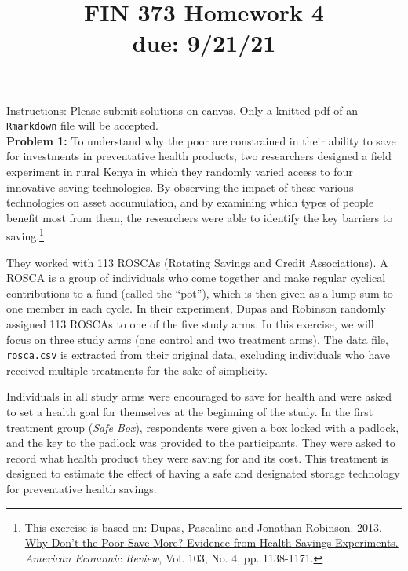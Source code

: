 \documentclass[11pt]{article}
\begin{document}
\title{FIN 373 Homework 4 \\ {\large due: \textbf{9/21/21}}}
\date{}
\maketitle

\vspace{-20mm}

\noindent Instructions: Please submit solutions on canvas.  Only a knitted pdf of an {\tt Rmarkdown} file will be accepted.
\\

\noindent \textbf{Problem 1:} To understand why the poor are constrained in their ability to save for investments in preventative health products, two researchers designed a field experiment in rural Kenya in which they randomly varied access to four innovative saving technologies. By observing the impact of these various technologies on asset accumulation, and by examining which types of people benefit most from them, the researchers were able to identify the key barriers to saving.\footnote{This exercise is based on: \href{http://dx.doi.org/10.1257/aer.103.4.1138}{Dupas, Pascaline and Jonathan Robinson. 2013. Why Don't the Poor Save More? Evidence from Health Savings Experiments.} \textit{American Economic Review}, Vol. 103, No. 4, pp. 1138-1171.}

They worked with 113 ROSCAs (Rotating Savings and Credit Associations). A ROSCA is a group of individuals who come together and make regular cyclical contributions to a fund (called the ``pot''), which is then given as a lump sum to one member in each cycle. In their experiment, Dupas and Robinson randomly assigned 113 ROSCAs to one of the five study arms. In this exercise, we will focus on three study arms (one control and two treatment arms). The data file, {\tt rosca.csv} is extracted from their original data, excluding individuals who have received multiple treatments for the sake of simplicity.

Individuals in all study arms were encouraged to save for health and were asked to set a health goal for themselves at the beginning of the study.  In the first treatment group (\textit{Safe Box}), respondents were given a box locked with a padlock, and the key to the padlock was provided to the participants. They were asked to record what health product they were saving for and its cost. This treatment is designed to estimate the effect of having a safe and designated storage technology for preventative health savings.  
\end{document}
